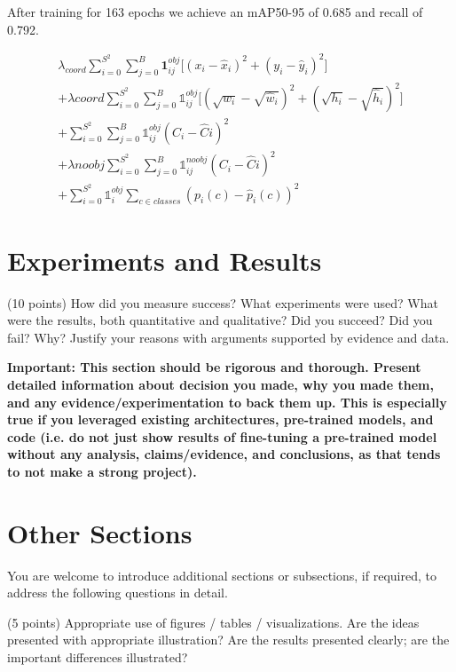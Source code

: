 \documentclass[10pt,twocolumn,letterpaper]{article}
\begin{document}
After training for 163 epochs we achieve an mAP50-95 of 0.685 and recall of 0.792.

\begin{multline}
\lambda_{coord}\sum_{i=0}^{S^2}\sum_{j=0}^{B}\mathbf{1}_{ij}^{obj}\Big[(x_i-\hat{x}_i)^2+(y_i-\hat{y}_i)^2\Big] \\ + \lambda{coord}\sum_{i=0}^{S^2}\sum_{j=0}^{B}\mathds{1}_{ij}^{obj}\Big[(\sqrt{w_i}-\sqrt{\hat{w}_i})^2+(\sqrt{h_i}-\sqrt{\hat{h}_i})^2\Big]\\
+\sum_{i=0}^{S^2}\sum_{j=0}^{B}\mathds{1}_{ij}^{obj}(C_i-\hat{C}i)^2\\
+\lambda{noobj}\sum_{i=0}^{S^2}\sum_{j=0}^{B}\mathds{1}_{ij}^{noobj}(C_i-\hat{C}i)^2\\
+\sum_{i=0}^{S^2}\mathds{1}_{i}^{obj}\sum_{c\in classes}(p_i(c)-\hat{p}_i(c))^2
\end{multline}


\section{Experiments and Results}

(10 points) How did you measure success? What experiments were used? What were the results, both quantitative and qualitative? Did you succeed? Did you fail? Why? Justify your reasons with arguments supported by evidence and data.

\textbf{Important: This section should be rigorous and thorough. Present detailed information about decision you made, why you made them, and any evidence/experimentation to back them up. This is especially true if you leveraged existing architectures, pre-trained models, and code (i.e. do not just show results of fine-tuning a pre-trained model without any analysis, claims/evidence, and conclusions, as that tends to not make a strong project). }

\section{Other Sections}


You are welcome to introduce additional sections or subsections, if required, to address the following questions in detail. 

(5 points) Appropriate use of figures / tables / visualizations. Are the ideas presented with appropriate illustration? Are the results presented clearly; are the important differences illustrated? 
\end{document}
